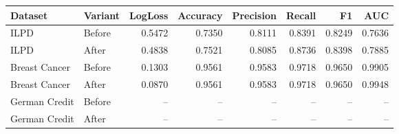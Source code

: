 \begin{tabular}{llrrrrrr}
\toprule
Dataset & Variant & LogLoss & Accuracy & Precision & Recall & F1 & AUC \\
\midrule
ILPD & Before & 0.5472 & 0.7350 & 0.8111 & 0.8391 & 0.8249 & 0.7636 \\
ILPD & After & 0.4838 & 0.7521 & 0.8085 & 0.8736 & 0.8398 & 0.7885 \\
Breast Cancer & Before & 0.1303 & 0.9561 & 0.9583 & 0.9718 & 0.9650 & 0.9905 \\
Breast Cancer & After & 0.0870 & 0.9561 & 0.9583 & 0.9718 & 0.9650 & 0.9948 \\
German Credit & Before & -- & -- & -- & -- & -- & -- \\
German Credit & After & -- & -- & -- & -- & -- & -- \\
\bottomrule
\end{tabular}
